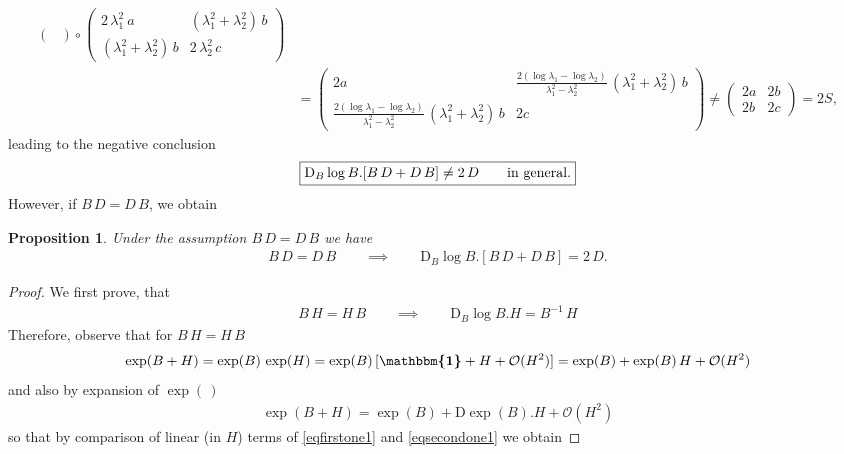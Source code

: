 \documentclass[10pt]{article}
\newcounter{theoremCounter}
\numberwithin{theoremCounter}{section}
\theoremstyle{plain}
\newtheorem{prop}[theoremCounter]{Proposition}
\theoremstyle{definition}
\newcommand{\id}{{\boldsymbol{\mathbbm{1}}}}
\newcommand{\DD}{\mathrm{D}}
\numberwithin{equation}{section}
\begin{document}
\begin{appendix}
\begin{equation}
\begin{alignedat}{2}
\begin{pmatrix}
	\end{pmatrix}
	\circ
	\begin{pmatrix}
	2 \, \lambda_1^2 \ a & (\lambda_1^2 + \lambda_2^2) \, b \\
	(\lambda_1^2 + \lambda_2^2) \, b & 2 \, \lambda_2^2 \, c
	\end{pmatrix} \\
	&=
	\begin{pmatrix}
	2a & \frac{2(\log \lambda_1 - \log \lambda_2)}{\lambda_1^2 - \lambda_2^2} \, (\lambda_1^2 + \lambda_2^2) \, b \\
	\frac{2(\log \lambda_1 - \log \lambda_2)}{\lambda_1^2 - \lambda_2^2} \, (\lambda_1^2 + \lambda_2^2) \, b & 2c
	\end{pmatrix}
	\neq
	\begin{pmatrix}
	2a & 2b \\
	2b & 2c
	\end{pmatrix}
	= 2S,
	\end{alignedat}
	\end{equation}
leading to the negative conclusion
	\begin{align}
	\label{eqboxed2D}
	\boxed{\DD_B \log B . [B \, D + D \, B] \neq 2 \, D \qquad \textnormal{in general.}}
	\end{align}
However, if $B \, D = D \, B$, we obtain
%
\begin{prop} \label{propA17}
Under the assumption $B \, D = D \, B$ we have
	\begin{align}
	\label{eqboxed3D}
	\boxed{B \, D = D \, B \qquad \implies \qquad \DD_B \log B.[B \, D + D \, B] = 2 \, D.}
	\end{align}
\end{prop}
%
\begin{proof}
We first prove, that
	\begin{align}
	\label{eqproofofa31}
	B \, H = H \, B \qquad \implies \qquad \DD_B \log B.H = B^{-1} \, H
	\end{align}
Therefore, observe that for $B \, H = H \, B$
	\begin{align}
	\label{eqfirstone1}
	\exp(B + H) = \exp(B) \, \exp(H) = \exp(B) \, [\id + H + \mathcal{O}(H^2)] = \exp(B) + \exp(B) \, H + \mathcal{O}(H^2)
	\end{align}
and also by expansion of $\exp(\,)$
	\begin{align}
	\label{eqsecondone1}
	\exp(B + H) = \exp(B) + \DD \exp(B).H + \mathcal{O}(H^2)
	\end{align}
so that by comparison of linear (in $H$) terms of \eqref{eqfirstone1} and \eqref{eqsecondone1} we obtain

\end{proof}
\end{appendix}
\end{document}
